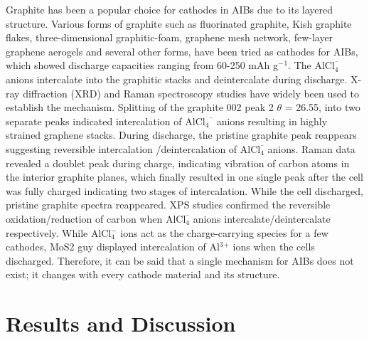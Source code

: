 \documentclass[num-refs]{wiley-article}
\begin{document}
Graphite has been a popular choice for cathodes in AIBs due to its layered structure. Various forms of graphite such as fluorinated graphite\cite{rani_fluorinated_2013}, Kish graphite flakes\cite{wang_kish_2017}, three-dimensional graphitic-foam\cite{lin_ultrafast_2015}, graphene mesh network\cite{chen_ultrafast_2017}, few-layer graphene aerogels\cite{qiao_defect-free_2019} and several other forms, have been tried as cathodes for AIBs, which showed discharge capacities ranging from 60-250 mAh g$^-{^1}$. The AlCl$_4^¯$ anions intercalate into the graphitic stacks and deintercalate during discharge. X-ray diffraction (XRD) and Raman spectroscopy studies have widely been used to establish the mechanism\cite{wang_advanced_2017}. Splitting of the graphite 002 peak 2 $\theta$ = 26.55, into two separate peaks indicated intercalation of AlCl$_4{^¯}$ anions resulting in highly strained graphene stacks.  During discharge, the pristine graphite peak reappears suggesting reversible intercalation /deintercalation of AlCl$_4^¯$ anions. Raman data revealed a doublet peak during charge, indicating vibration of carbon atoms in the interior graphite planes, which finally resulted in one single peak after the cell was fully charged indicating two stages of intercalation. While the cell discharged, pristine graphite spectra reappeared. XPS studies confirmed the reversible oxidation/reduction of carbon when AlCl$_4^¯$ anions intercalate/deintercalate respectively. While AlCl$_4^-$ ions act as the charge-carrying species for a few cathodes, MoS2 guy displayed intercalation of Al$^3{^+}$ ions when the cells discharged. Therefore, it can be said that a single mechanism for AIBs does not exist; it changes with every cathode material and its structure. 


\section{Results and Discussion}
\end{document}
